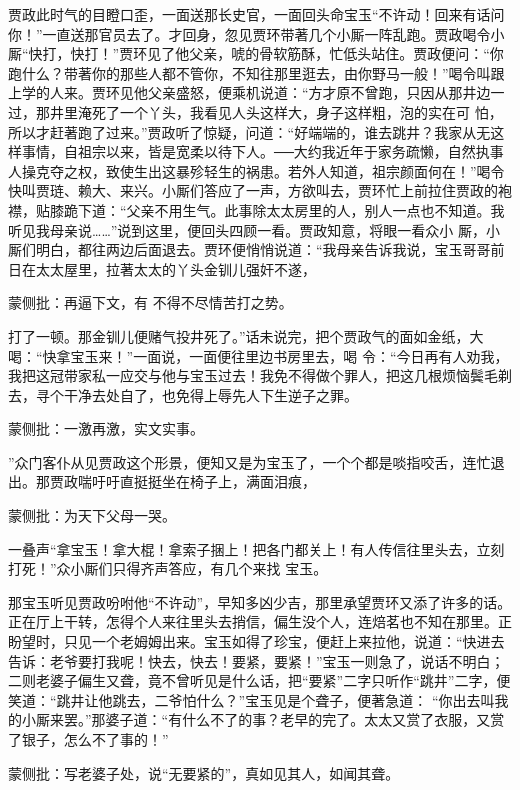 \begin{parag}


    贾政此时气的目瞪口歪，一面送那长史官，一面回头命宝玉“不许动！回来有话问你！”一直送那官员去了。才回身，忽见贾环带著几个小厮一阵乱跑。贾政喝令小厮“快打，快打！”贾环见了他父亲，唬的骨软筋酥，忙低头站住。贾政便问：“你跑什么？带著你的那些人都不管你，不知往那里逛去，由你野马一般！”喝令叫跟上学的人来。贾环见他父亲盛怒，便乘机说道：“方才原不曾跑，只因从那井边一过，那井里淹死了一个丫头，我看见人头这样大，身子这样粗，泡的实在可 怕，所以才赶著跑了过来。”贾政听了惊疑，问道：“好端端的，谁去跳井？我家从无这样事情，自祖宗以来，皆是宽柔以待下人。──大约我近年于家务疏懒，自然执事人操克夺之权，致使生出这暴殄轻生的祸患。若外人知道，祖宗颜面何在！”喝令快叫贾琏、赖大、来兴。小厮们答应了一声，方欲叫去，贾环忙上前拉住贾政的袍襟，贴膝跪下道：“父亲不用生气。此事除太太房里的人，别人一点也不知道。我听见我母亲说……”说到这里，便回头四顾一看。贾政知意，将眼一看众小 厮，小厮们明白，都往两边后面退去。贾环便悄悄说道：“我母亲告诉我说，宝玉哥哥前日在太太屋里，拉著太太的丫头金钏儿强奸不遂，\begin{note}蒙侧批：再逼下文，有 不得不尽情苦打之势。\end{note}打了一顿。那金钏儿便赌气投井死了。”话未说完，把个贾政气的面如金纸，大喝：“快拿宝玉来！”一面说，一面便往里边书房里去，喝 令：“今日再有人劝我，我把这冠带家私一应交与他与宝玉过去！我免不得做个罪人，把这几根烦恼鬓毛剃去，寻个干净去处自了，也免得上辱先人下生逆子之罪。\begin{note}蒙侧批：一激再激，实文实事。\end{note}”众门客仆从见贾政这个形景，便知又是为宝玉了，一个个都是啖指咬舌，连忙退出。那贾政喘吁吁直挺挺坐在椅子上，满面泪痕，\begin{note}蒙侧批：为天下父母一哭。\end{note}一叠声“拿宝玉！拿大棍！拿索子捆上！把各门都关上！有人传信往里头去，立刻打死！”众小厮们只得齐声答应，有几个来找 宝玉。
\end{parag}


\begin{parag}


    那宝玉听见贾政吩咐他“不许动”，早知多凶少吉，那里承望贾环又添了许多的话。正在厅上干转，怎得个人来往里头去捎信，偏生没个人，连焙茗也不知在那里。正盼望时，只见一个老姆姆出来。宝玉如得了珍宝，便赶上来拉他，说道：“快进去告诉：老爷要打我呢！快去，快去！要紧，要紧！”宝玉一则急了，说话不明白；二则老婆子偏生又聋，竟不曾听见是什么话，把“要紧”二字只听作“跳井”二字，便笑道：“跳井让他跳去，二爷怕什么？”宝玉见是个聋子，便著急道： “你出去叫我的小厮来罢。”那婆子道：“有什么不了的事？老早的完了。太太又赏了衣服，又赏了银子，怎么不了事的！”\begin{note}蒙侧批：写老婆子处，说“无要紧的”，真如见其人，如闻其聋。\end{note}
\end{parag}


